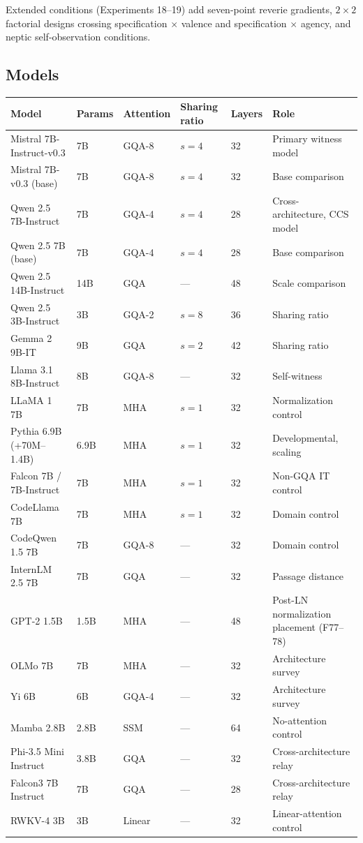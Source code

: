 \documentclass[12pt]{article}
\begin{document}
Extended conditions (Experiments 18--19) add seven-point reverie gradients, $2\times2$ factorial designs crossing specification $\times$ valence and specification $\times$ agency, and neptic self-observation conditions.

\subsection{Models}

\begin{table}[h]
\centering
\small
\begin{tabular}{llllll}
\toprule
\textbf{Model} & \textbf{Params} & \textbf{Attention} & \textbf{Sharing ratio} & \textbf{Layers} & \textbf{Role} \\
\midrule
Mistral 7B-Instruct-v0.3 & 7B & GQA-8 & $s=4$ & 32 & Primary witness model \\
Mistral 7B-v0.3 (base) & 7B & GQA-8 & $s=4$ & 32 & Base comparison \\
Qwen 2.5 7B-Instruct & 7B & GQA-4 & $s=4$ & 28 & Cross-architecture, CCS model \\
Qwen 2.5 7B (base) & 7B & GQA-4 & $s=4$ & 28 & Base comparison \\
Qwen 2.5 14B-Instruct & 14B & GQA & --- & 48 & Scale comparison \\
Qwen 2.5 3B-Instruct & 3B & GQA-2 & $s=8$ & 36 & Sharing ratio \\
Gemma 2 9B-IT & 9B & GQA & $s=2$ & 42 & Sharing ratio \\
Llama 3.1 8B-Instruct & 8B & GQA-8 & --- & 32 & Self-witness \\
LLaMA 1 7B & 7B & MHA & $s=1$ & 32 & Normalization control \\
Pythia 6.9B (+70M--1.4B) & 6.9B & MHA & $s=1$ & 32 & Developmental, scaling \\
Falcon 7B / 7B-Instruct & 7B & MHA & $s=1$ & 32 & Non-GQA IT control \\
CodeLlama 7B & 7B & MHA & $s=1$ & 32 & Domain control \\
CodeQwen 1.5 7B & 7B & GQA-8 & --- & 32 & Domain control \\
InternLM 2.5 7B & 7B & GQA & --- & 32 & Passage distance \\
GPT-2 1.5B & 1.5B & MHA & --- & 48 & Post-LN normalization placement (F77--78) \\
OLMo 7B & 7B & MHA & --- & 32 & Architecture survey \\
Yi 6B & 6B & GQA-4 & --- & 32 & Architecture survey \\
Mamba 2.8B & 2.8B & SSM & --- & 64 & No-attention control \\
Phi-3.5 Mini Instruct & 3.8B & GQA & --- & 32 & Cross-architecture relay \\
Falcon3 7B Instruct & 7B & GQA & --- & 28 & Cross-architecture relay \\
RWKV-4 3B & 3B & Linear & --- & 32 & Linear-attention control \\
\bottomrule
\end{tabular}
\end{table}
\end{document}

